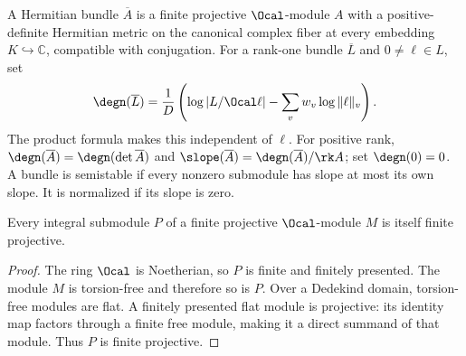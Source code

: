 \begin{definition}
\label{def:hermitian-degree}
\leanok
A Hermitian bundle $\overline A$ is a finite projective $\Ocal$-module $A$
with a positive-definite Hermitian metric on the canonical complex fiber
at every embedding $K\hookrightarrow\mathbb C$, compatible with conjugation.
For a rank-one bundle $\overline L$ and $0\ne\ell\in L$, set
\[
 \degn(\overline L)=\frac{1}{D}\left(
 \log|L/\Ocal\ell|-\sum_v w_v\log\|\ell\|_v\right).
\]
The product formula makes this independent of $\ell$. For positive rank,
$\degn(\overline A)=\degn(\det\overline A)$ and
$\slope(\overline A)=\degn(\overline A)/\rk A$; set $\degn(0)=0$.
A bundle is semistable if every nonzero submodule has slope at most its own
slope. It is normalized if its slope is zero.
\end{definition}

\begin{lemma}
\label{lem:integral-submodule-projective}\leanok
Every integral submodule $P$ of a finite projective $\Ocal$-module $M$
is itself finite projective.
\end{lemma}
\begin{proof}
The ring $\Ocal$ is Noetherian, so $P$ is finite and finitely presented.
The module $M$ is torsion-free and therefore so is $P$. Over a Dedekind
domain, torsion-free modules are flat. A finitely presented flat module
is projective: its identity map factors through a finite free module,
making it a direct summand of that module. Thus $P$ is finite projective.
\end{proof}

